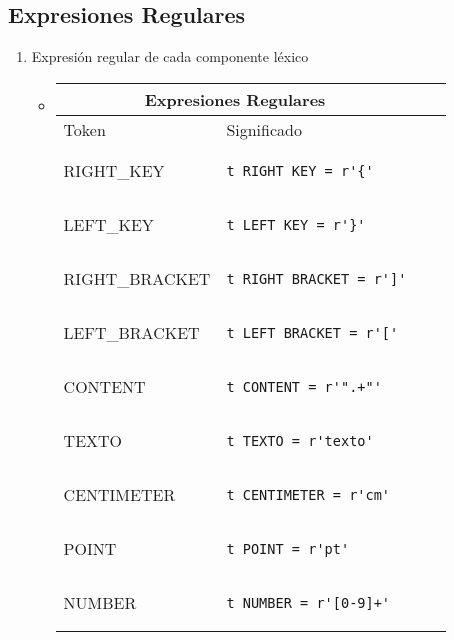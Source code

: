 \documentclass[12pt]{article}
\newcommand{\sectionbreak}{\clearpage}
\begin{document}
\sectionbreak
\subsection{Expresiones Regulares}
\begin{enumerate}
    \item Expresión regular de cada componente léxico
        \begin{itemize}
            \item \begin{tabular}{ |p{6cm}||p{8cm}|p{3cm}|p{3cm}|  }
            \hline
            \multicolumn{2}{|c|}{Expresiones Regulares} \\
            \hline  Token& Significado\\ 
            \hline
            \hline RIGHT\_KEY & \begin{verbatim}t_RIGHT_KEY = r'{'\end{verbatim} \\
            \hline LEFT\_KEY & \begin{verbatim}t_LEFT_KEY = r'}'\end{verbatim} \\
            \hline RIGHT\_BRACKET & \begin{verbatim}t_RIGHT_BRACKET = r']'\end{verbatim} \\
            \hline LEFT\_BRACKET & \begin{verbatim}t_LEFT_BRACKET = r'['\end{verbatim} \\
            \hline CONTENT & \begin{verbatim}t_CONTENT = r'".+"'\end{verbatim} \\
            \hline TEXTO & \begin{verbatim}t_TEXTO = r'texto'\end{verbatim} \\
            \hline CENTIMETER & \begin{verbatim}t_CENTIMETER = r'cm'\end{verbatim} \\
            \hline POINT & \begin{verbatim}t_POINT = r'pt'\end{verbatim} \\
            \hline NUMBER & \begin{verbatim}t_NUMBER = r'[0-9]+'\end{verbatim} \\

\end{tabular}
\end{itemize}
\end{enumerate}
\end{document}

